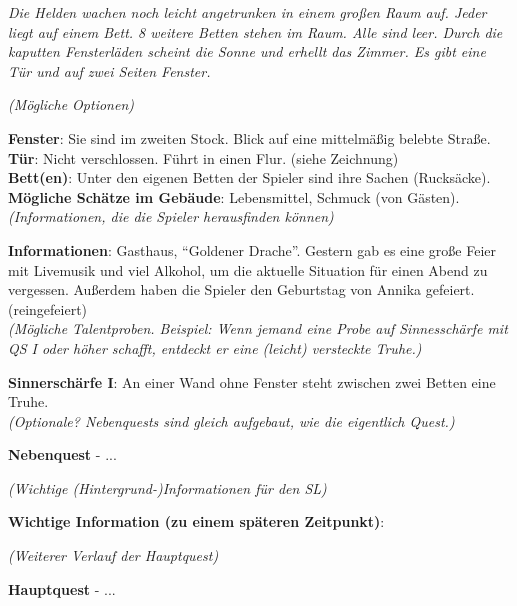 \textit{Die Helden wachen noch leicht angetrunken in einem großen Raum auf. Jeder liegt auf einem Bett. 8 weitere Betten stehen im Raum. Alle sind leer. Durch die kaputten Fensterläden scheint die Sonne und erhellt das Zimmer. Es gibt eine Tür und auf zwei Seiten Fenster.} 

\textit{(Mögliche Optionen)}

\textbf{Fenster}: Sie sind im zweiten Stock. Blick auf eine mittelmäßig belebte Straße.\\
\textbf{Tür}: Nicht verschlossen. Führt in einen Flur. (siehe Zeichnung)\\
\textbf{Bett(en)}: Unter den eigenen Betten der Spieler sind ihre Sachen (Rucksäcke).\\
\textbf{Mögliche Schätze im Gebäude}: Lebensmittel, Schmuck (von Gästen).\\

\textit{(Informationen, die die Spieler herausfinden können)}

\textbf{Informationen}: Gasthaus, "`Goldener Drache"'. Gestern gab es eine große Feier mit Livemusik und viel Alkohol, um die aktuelle Situation für einen Abend zu vergessen. Außerdem haben die Spieler den Geburtstag von Annika gefeiert. (reingefeiert) \\

\textit{(Mögliche Talentproben. Beispiel: Wenn jemand eine Probe auf Sinnesschärfe mit QS I oder höher schafft, entdeckt er eine (leicht) versteckte Truhe.)}

\textbf{Sinnerschärfe I}: An einer Wand ohne Fenster steht zwischen zwei Betten eine Truhe.\\

\textit{(Optionale? Nebenquests sind gleich aufgebaut, wie die eigentlich Quest.)}

\textbf{Nebenquest} - ...

\textit{(Wichtige (Hintergrund-)Informationen für den SL)}

\textbf{Wichtige Information (zu einem späteren Zeitpunkt)}:

\textit{(Weiterer Verlauf der Hauptquest)}

\textbf{Hauptquest} - ...
